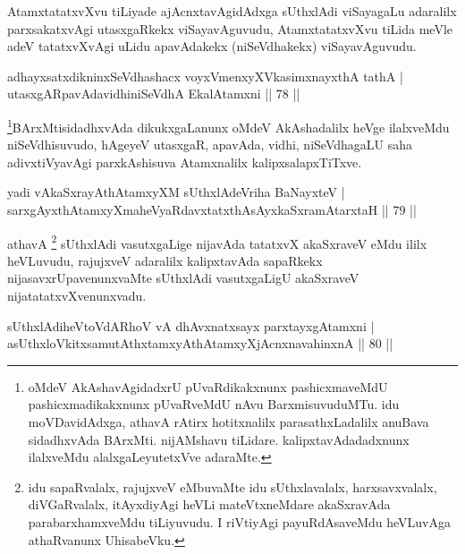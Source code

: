 \begin{artha}
AtamxtatatxvXvu tiLiyade ajAcnxtavAgidAdxga sUthxlAdi viSayagaLu adaralilx parxsakatxvAgi utasxgaRkekx viSayavAguvudu, AtamxtatatxvXvu tiLida meVle adeV tatatxvXvAgi uLidu apavAdakekx (niSeVdhakekx) viSayavAguvudu.
\end{artha}

\begin{shl}
adhayxsatxdikninxSeVdhashacx voyxVmenxyXVkasimxnayxthA tathA |\\
utasxgARpavAdavidhiniSeVdhA EkalAtamxni \hfill || 78 ||
\end{shl}

\begin{artha}%
\footnote[1]{oMdeV AkAshavAgidadxrU pUvaRdikakxnunx pashicxmaveMdU pashicxmadikakxnunx pUvaRveMdU nAvu BarxmisuvuduMTu. idu moVDavidAdxga, athavA rAtirx hotitxnalilx parasathxLadalilx anuBava sidadhxvAda BArxMti. nijAMshavu tiLidare. kalipxtavAdadadxnunx ilalxveMdu alalxgaLeyutetxVve adaraMte.}BArxMtisidadhxvAda dikukxgaLanunx oMdeV AkAshadalilx heVge ilalxveMdu niSeVdhi\-suvudo, hAgeyeV utasxgaR, apavAda, vidhi, niSeVdhagaLU saha adivxtiVyavAgi parxkAshisuva Atamxnalilx kalipxsalapxTiTxve.
\end{artha}


\begin{shl}
yadi vA\s kaSxrayAthAtamxyXM sUthxlAdeVriha BaNayxteV |\\
sarxgAyxthAtamxyXmaheVyaRdavxtatxthA\s sAyxkaSxramAtarxtaH \hfill || 79 ||
\end{shl}

\begin{artha}
athavA \footnote[2]{idu sapaRvalalx, rajujxveV eMbuvaMte idu sUthxlavalalx, harxsavxvalalx, diVGaRvalalx, itAyxdiyAgi heVLi mateVtxneMdare akaSxravAda parabarxhamxveMdu tiLiyuvudu. I riVtiyAgi payuRdAsaveMdu heVLuvAga athaRvanunx UhisabeVku.} sUthxlAdi vasutxgaLige nijavAda tatatxvX akaSxraveV eMdu ililx heVLuvudu, rajujxveV adaralilx kalipxtavAda sapaRkekx nijasavxrUpavenunxvaMte sUthxlAdi vasutxgaLigU akaSxraveV nijatatatxvXvenunxvadu.
\end{artha}

\begin{shl}
sUthxlAdiheVtoVdARhoV vA dhAvxnatxsayx parxtayxgAtamxni |\\
asUthxloVkitxsamutAthxtamxyAthAtamxyXjAcnxnavahinxnA \hfill || 80 ||
\end{shl}

